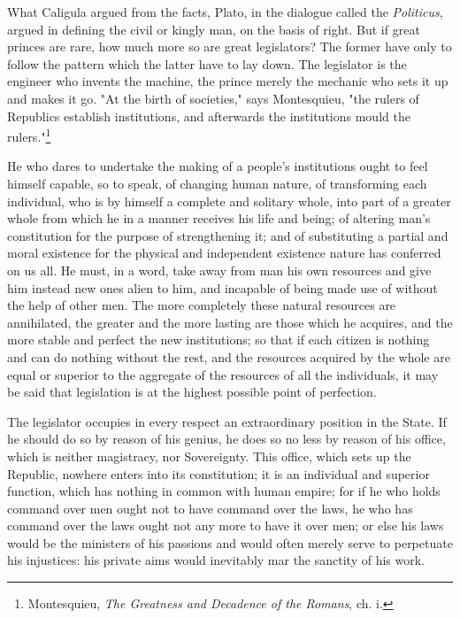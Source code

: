 \documentclass[12pt]{book}
\begin{document}
What Caligula argued from the facts, Plato, in the dialogue called the \textit{Politicus}, argued in defining the civil or kingly man, on the basis of right. But if great princes are rare, how much more so are great legislators? The former have only to follow the pattern which the latter have to lay down. The legislator is the engineer who invents the machine, the prince merely the mechanic who sets it up and makes it go. "At the birth of societies," says Montesquieu, "the rulers of Republics establish institutions, and afterwards the institutions mould the rulers."\footnote{Montesquieu, \textit{The Greatness and Decadence of the Romans}, ch. i.}

He who dares to undertake the making of a people's institutions ought to feel himself capable, so to speak, of changing human nature, of transforming each individual, who is by himself a complete and solitary whole, into part of a greater whole from which he in a manner receives his life and being; of altering man's constitution for the purpose of strengthening it; and of substituting a partial and moral existence for the physical and independent existence nature has conferred on us all. He must, in a word, take away from man his own resources and give him instead new ones alien to him, and incapable of being made use of without the help of other men. The more completely these natural resources are annihilated, the greater and the more lasting are those which he acquires, and the more stable and perfect the new institutions; so that if each citizen is nothing and can do nothing without the rest, and the resources acquired by the whole are equal or superior to the aggregate of the resources of all the individuals, it may be said that legislation is at the highest possible point of perfection.

The legislator occupies in every respect an extraordinary position in the State. If he should do so by reason of his genius, he does so no less by reason of his office, which is neither magistracy, nor Sovereignty. This office, which sets up the Republic, nowhere enters into its constitution; it is an individual and superior function, which has nothing in common with human empire; for if he who holds command over men ought not to have command over the laws, he who has command over the laws ought not any more to have it over men; or else his laws would be the ministers of his passions and would often merely serve to perpetuate his injustices: his private aims would inevitably mar the sanctity of his work.
\end{document}
